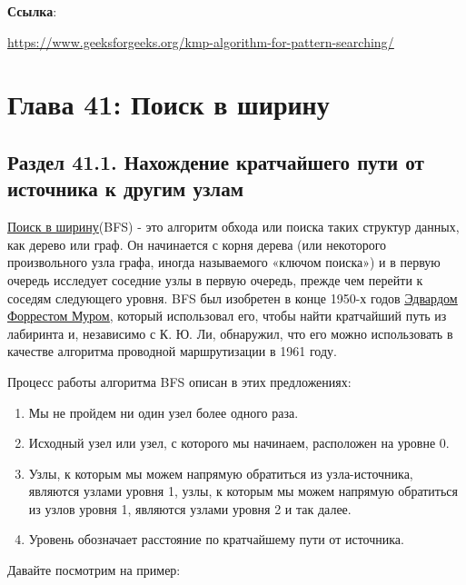 \textbf{Ссылка}:

\vspace{\baselineskip}

\href{https://www.geeksforgeeks.org/kmp-algorithm-for-pattern-searching/}{\underline{https://www.geeksforgeeks.org/kmp-algorithm-for-pattern-searching/}}

\chapter*{Глава 41: Поиск в ширину}
\section*{Раздел 41.1. Нахождение кратчайшего пути от источника к другим узлам}

\href{https://vk.cc/9pBLeT}{\underline{Поиск в ширину}}(BFS) - это алгоритм обхода или поиска таких структур данных, как дерево или граф. Он начинается с корня дерева (или некоторого произвольного узла графа, иногда называемого «ключом поиска») и в первую очередь исследует соседние узлы в первую очередь, прежде чем перейти к соседям следующего уровня. BFS был изобретен в конце 1950-х годов \href{https://en.wikipedia.org/wiki/Edward_F._Moore}{\underline{Эдвардом Форрестом Муром}}, который использовал его, чтобы найти кратчайший путь из лабиринта и, независимо с К. Ю. Ли, обнаружил, что его можно использовать в качестве алгоритма проводной маршрутизации в 1961 году.

\vspace{\baselineskip}

Процесс работы алгоритма BFS описан в этих предложениях:

\begin{enumerate}
    \item Мы не пройдем ни один узел более одного раза.
    \item Исходный узел или узел, с которого мы начинаем, расположен на уровне 0.
    \item Узлы, к которым мы можем напрямую обратиться из узла-источника, являются узлами уровня 1, узлы, к которым мы можем напрямую обратиться из узлов уровня 1, являются узлами уровня 2 и так далее.
    \item Уровень обозначает расстояние по кратчайшему пути от источника.
\end{enumerate}

Давайте посмотрим на пример:

\begin{center}
\end{center}

